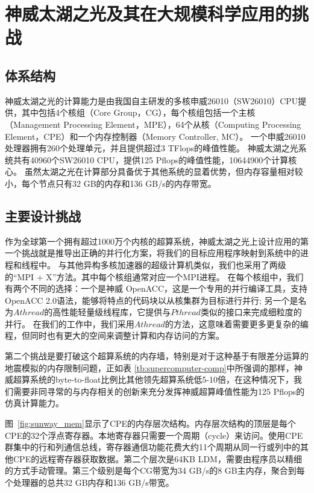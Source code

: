 \documentclass[degree=doctor]{thuthesis}
\begin{document}
\section{神威太湖之光及其在大规模科学应用的挑战}
\label{sec:sunway}

\subsection{体系结构}
神威太湖之光的计算能力是由我国自主研发的多核申威26010（SW26010）CPU提供，其中包括4个核组（Core Group，CG）\citep {fu2016sunway}，每个核组包括一个主核（Management Processing Element，MPE），64个从核（Computing Processing Element，CPE）和一个内存控制器（Memory Controller, MC）。 一个申威26010处理器拥有260个处理单元，并且提供超过3 TFlops的峰值性能。 神威太湖之光系统共有40960个SW26010 CPU，提供125 Pflops的峰值性能，10644900个计算核心。 虽然太湖之光在计算部分具备优于其他系统的显着优势，但内存容量相对较小，每个节点只有32 GB的内存和136 GB/s的内存带宽。


\subsection{主要设计挑战}
\label{sec:sunway-challenge}

作为全球第一个拥有超过1000万个内核的超算系统，神威太湖之光上设计应用的第一个挑战就是推导出正确的并行化方案，将我们的目标应用程序映射到系统中的进程和线程中。 与其他异构多核加速器的超级计算机类似，我们也采用了两级的“MPI + X”方法。其中每个核组通常对应一个MPI进程。 在每个核组中，我们有两个不同的选择：一个是神威 OpenACC，这是一个专用的并行编译工具，支持OpenACC 2.0语法，能够将特点的代码块以从核集群为目标进行并行; 另一个是名为$ Athread$的高性能轻量级线程库，它提供与$ Pthread $类似的接口来完成细粒度的并行。 在我们的工作中，我们采用$ Athread $的方法，这意味着需要更多更复杂的编程，但同时也有更大的空间来调整计算和内存访问的方案。

第二个挑战是要打破这个超算系统的内存墙，特别是对于这种基于有限差分运算的地震模拟的内存限制问题，正如表 \ref {tb:supercomputer-comp}中所强调的那样，神威超算系统的byte-to-float比例比其他领先超算系统低5-10倍，在这种情况下，我们需要非同寻常的与内存相关的创新来充分发挥神威超算峰值性能为125 Pflops的仿真计算能力。

图~\ref {fig:sunway_mem}显示了CPE的内存层次结构。内存层次结构的顶层是每个CPE的32个浮点寄存器。本地寄存器只需要一个周期（cycle）来访问。使用CPE群集中的行和列通信总线，寄存器通信功能花费大约11个周期从同一行或列中的其他CPE的远程寄存器获取数据。第二个层次是64KB LDM，需要由程序员以精细的方式手动管理。第三个级别是每个CG带宽为34 GB/s的8 GB主内存，聚合到每个处理器的总共32 GB内存和136 GB/s带宽。
\end{document}
